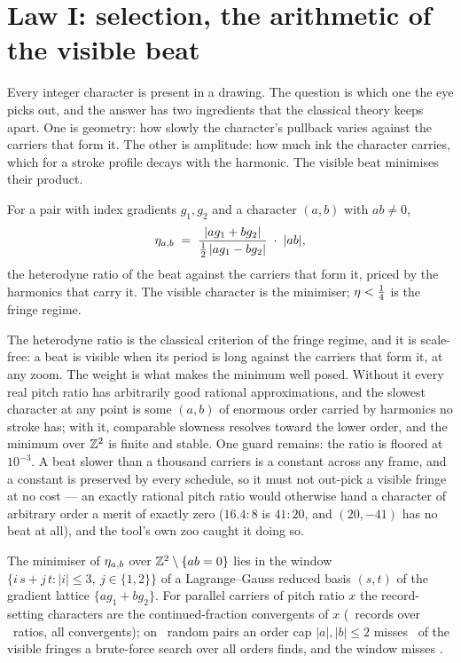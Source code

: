 \section{Law I: selection, the arithmetic of the visible beat}
\label{sec:selection}

Every integer character is present in a drawing. The question is which one
the eye picks out, and the answer has two ingredients that the classical
theory keeps apart. One is geometry: how slowly the character's pullback
varies against the carriers that form it. The other is amplitude: how much ink
the character carries, which for a stroke profile decays with the harmonic.
The visible beat minimises their product.

\begin{definition}
\label{def:merit}
For a pair with index gradients $g_1,g_2$ and a character $(a,b)$ with $ab\ne0$,
\[
  \eta_{a,b}\;=\;\frac{|a g_1+b g_2|}{\tfrac12\,|a g_1-b g_2|}\;\cdot\;|ab|,
\]
the heterodyne ratio of the beat against the carriers that form it, priced by
the harmonics that carry it. The visible character is the minimiser;
$\eta<\tfrac14$ is the fringe regime.
\end{definition}

The heterodyne ratio is the classical criterion of the fringe regime, and it
is scale-free: a beat is visible when its period is long against the carriers
that form it, at any zoom. The weight is what makes the minimum well posed.
Without it every real pitch ratio has arbitrarily good rational
approximations, and the slowest character at any point is some $(a,b)$ of
enormous order carried by harmonics no stroke has; with it, comparable
slowness resolves toward the lower order, and the minimum over $\mathbb{Z}^2$ is
finite and stable. One guard remains: the ratio is floored at $10^{-3}$. A
beat slower than a thousand carriers is a constant across any frame, and a
constant is preserved by every schedule, so it must not out-pick a visible
fringe at no cost --- an exactly rational pitch ratio would otherwise hand
a character of arbitrary order a merit of exactly zero ($16.4{:}8$ is
$41{:}20$, and $(20,-41)$ has no beat at all), and the tool's own zoo caught
it doing so.

\begin{proposition}
\label{prop:selection}
The minimiser of $\eta_{a,b}$ over $\mathbb{Z}^2\setminus\{ab=0\}$ lies in the window
$\{i\,s+j\,t : |i|\le3,\ j\in\{1,2\}\}$ of a Lagrange--Gauss reduced basis
$(s,t)$ of the gradient lattice $\{a g_1+b g_2\}$. For parallel carriers of
pitch ratio $x$ the record-setting characters are the continued-fraction
convergents of $x$ (\selRecordsMatch\ records over \selRatios\ ratios, all
convergents); on \selTrials\ random pairs an order cap $|a|,|b|\le2$ misses
\selCapMiss\ of the visible fringes a brute-force search over all orders
finds, and the window misses \selShipMiss.
\end{proposition}

